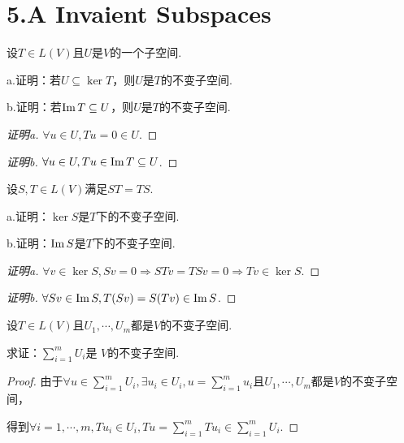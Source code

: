 \section{5.A Invaient Subspaces}

\begin{problem}[1]\label{5.A.1}
    设\(T \in L(V)\)且\(U\)是\(V\)的一个子空间.

    a.证明：若\(U \subseteq \ker T\)，则\(U\)是\(T\)的不变子空间.

    b.证明：若\(\operatorname{Im} T \subseteq U\)，则\(U\)是\(T\)的不变子空间.
\end{problem}

\begin{proof}[证明a]
    \(\forall u \in U,Tu=0 \in U\).
\end{proof}

\begin{proof}[证明b]
    \(\forall u \in U,Tu \in \operatorname{Im} T \subseteq U\).
\end{proof}

\begin{problem}[2]\label{5.A.2}
    设\(S,T \in L(V)\)满足\(ST=TS\).

    a.证明：\(\ker S\)是\(T\)下的不变子空间.
    
    b.证明：\(\operatorname{Im} S\)是\(T\)下的不变子空间.
\end{problem}

\begin{proof}[证明a]
    \(\forall v \in \ker S,Sv=0 \Rightarrow STv=TSv=0 \Rightarrow Tv \in \ker S\).
\end{proof}

\begin{proof}[证明b]
    \(\forall Sv \in \operatorname{Im} S,T(Sv)=S(Tv) \in \operatorname{Im} S\).
\end{proof}

\begin{problem}[4]\label{5.A.4}
    设\(T \in L(V)\)且\(U_1,\cdots,U_m\)都是\(V\)的不变子空间.
    
    求证：\(\sum_{i=1}^m U_i\)是 \(V\)的不变子空间.
\end{problem}

\begin{proof}
    由于\(\forall u \in \sum_{i=1}^m U_i,\exists u_i \in U_i,u=\sum_{i=1}^m u_i\)且\(U_1,\cdots,U_m\)都是\(V\)的不变子空间，

    得到\(\forall i=1,\cdots,m,Tu_i \in U_i,Tu=\sum_{i=1}^m Tu_i \in \sum_{i=1}^m U_i\).
\end{proof}

